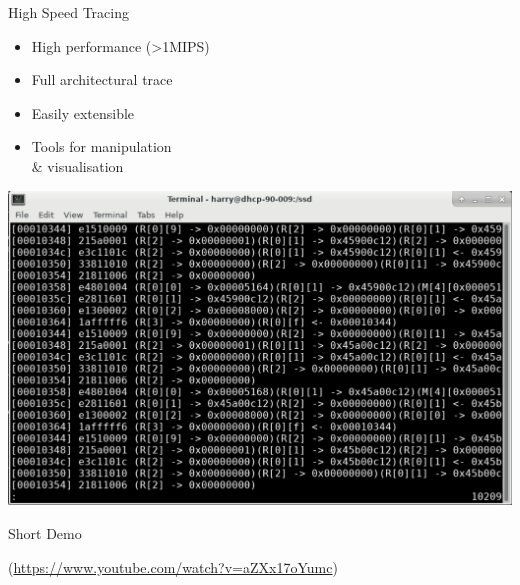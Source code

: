 \begin{frame}{High Speed Tracing}

\begin{minipage}[h]{0.45\textwidth}
\begin{itemize}
	\item High performance (>1MIPS)
	\item Full architectural trace
	\item Easily extensible
	\item Tools for manipulation \\\& visualisation
\end{itemize}
\end{minipage} %
\begin{minipage}[h]{0.45\textwidth}
\centering
\includegraphics[width=\textwidth]{figures/trace}
\end{minipage}

\end{frame}

\begin{frame}{Short Demo}

(\url{https://www.youtube.com/watch?v=aZXx17oYumc})

\end{frame}
